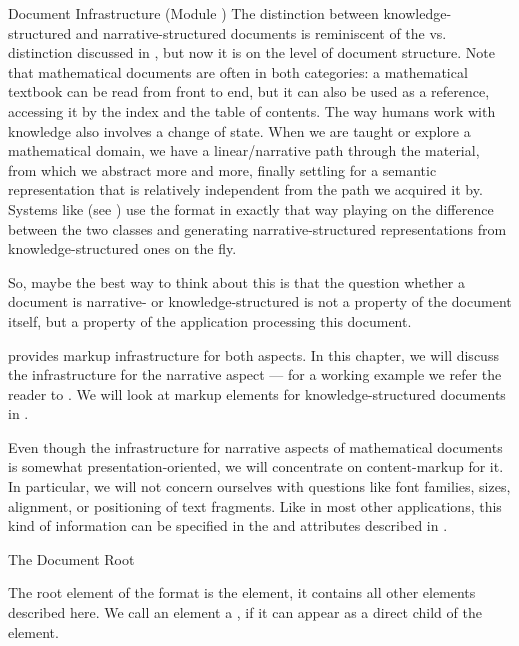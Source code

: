 \begin{tchapter}[id=omdoc-infrastructure,short=Document Infrastructure]{Document Infrastructure (Module {})}
The distinction between knowledge-structured and narrative-structured documents is
reminiscent of the {} vs.  {}
distinction discussed in
{}, but now it is on the level of document structure.  Note that
mathematical documents are often in both categories: a mathematical textbook can be read
from front to end, but it can also be used as a reference, accessing it by the index and
the table of contents.  The way humans work with knowledge also involves a change of
state. When we are taught or explore a mathematical domain, we have a linear/narrative
path through the material, from which we abstract more and more, finally settling for a
semantic representation that is relatively independent from the path we acquired it by.
Systems like {\activemath} (see {}) use the {\omdoc} format in
exactly that way playing on the difference between the two classes and generating
narrative-structured representations from knowledge-structured ones on the fly.

So, maybe the best way to think about this is that the question whether a document
is narrative- or knowledge-structured is not a property of the document itself,
but a property of the application processing this document.

{\omdoc} provides markup infrastructure for both aspects. In this chapter, we will discuss
the infrastructure for the narrative aspect --- for a working example we refer the reader
to {}. We will look at markup elements for knowledge-structured
documents in {}.

Even though the infrastructure for narrative aspects of mathematical documents is somewhat
presentation-oriented, we will concentrate on content-markup for it. In particular, we
will not concern ourselves with questions like font families, sizes, alignment, or
positioning of text fragments. Like in most other {\xml} applications, this kind of
information can be specified in the {\css} {} and
{} attributes described in {}.

\begin{tsection}[id=root]{The Document Root}
  
  The {\xml} root element of the {\omdoc} format is the {} element, it
  contains all other elements described here. We call an {\omdoc} element a
  {}, if it can appear as a direct child of the
  {} element.
  

\end{tsection}
\end{tchapter}
